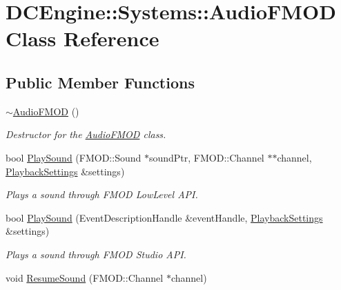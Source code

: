 \hypertarget{classDCEngine_1_1Systems_1_1AudioFMOD}{\section{D\-C\-Engine\-:\-:Systems\-:\-:Audio\-F\-M\-O\-D Class Reference}
\label{classDCEngine_1_1Systems_1_1AudioFMOD}
}
\subsection*{Public Member Functions}
\begin{DoxyCompactItemize}
\item 
\hypertarget{classDCEngine_1_1Systems_1_1AudioFMOD_ab67b73b6e40b905d950877d1488eb818}{\hyperlink{classDCEngine_1_1Systems_1_1AudioFMOD_ab67b73b6e40b905d950877d1488eb818}{$\sim$\-Audio\-F\-M\-O\-D} ()}\label{classDCEngine_1_1Systems_1_1AudioFMOD_ab67b73b6e40b905d950877d1488eb818}

\begin{DoxyCompactList}\small\item\em Destructor for the \hyperlink{classDCEngine_1_1Systems_1_1AudioFMOD}{Audio\-F\-M\-O\-D} class. \end{DoxyCompactList}\item 
bool \hyperlink{classDCEngine_1_1Systems_1_1AudioFMOD_ab5869328256aa9429c8b486a2de9bc5e}{Play\-Sound} (F\-M\-O\-D\-::\-Sound $\ast$sound\-Ptr, F\-M\-O\-D\-::\-Channel $\ast$$\ast$channel, \hyperlink{structDCEngine_1_1Systems_1_1PlaybackSettings}{Playback\-Settings} \&settings)
\begin{DoxyCompactList}\small\item\em Plays a sound through F\-M\-O\-D Low\-Level A\-P\-I. \end{DoxyCompactList}\item 
bool \hyperlink{classDCEngine_1_1Systems_1_1AudioFMOD_a0b753ebc1c4591f15892fdf065f0b2f3}{Play\-Sound} (Event\-Description\-Handle \&event\-Handle, \hyperlink{structDCEngine_1_1Systems_1_1PlaybackSettings}{Playback\-Settings} \&settings)
\begin{DoxyCompactList}\small\item\em Plays a sound through F\-M\-O\-D Studio A\-P\-I. \end{DoxyCompactList}\item 
\hypertarget{classDCEngine_1_1Systems_1_1AudioFMOD_a117772d95e7b83324a03f83e5e4b5b40}{void \hyperlink{classDCEngine_1_1Systems_1_1AudioFMOD_a117772d95e7b83324a03f83e5e4b5b40}{Resume\-Sound} (F\-M\-O\-D\-::\-Channel $\ast$channel)}\label{classDCEngine_1_1Systems_1_1AudioFMOD_a117772d95e7b83324a03f83e5e4b5b40}


\end{DoxyCompactItemize}
